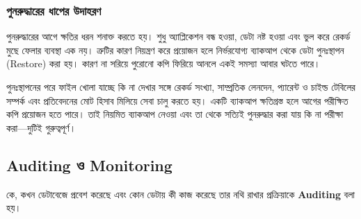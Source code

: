 \subsubsection{পুনরুদ্ধারের ধাপের উদাহরণ}
পুনরুদ্ধারের আগে ক্ষতির ধরন শনাক্ত করতে হয়। শুধু অ্যাপ্লিকেশন বন্ধ হওয়া, ডেটা নষ্ট হওয়া এবং ভুল করে রেকর্ড মুছে ফেলার ব্যবস্থা এক নয়। ত্রুটির কারণ নিয়ন্ত্রণ করে প্রয়োজন হলে নির্ভরযোগ্য ব্যাকআপ থেকে ডেটা পুনঃস্থাপন (Restore) করা হয়। কারণ না সরিয়ে পুরোনো কপি ফিরিয়ে আনলে একই সমস্যা আবার ঘটতে পারে।

পুনঃস্থাপনের পরে ফাইল খোলা যাচ্ছে কি না দেখার সঙ্গে রেকর্ড সংখ্যা, সাম্প্রতিক লেনদেন, প্যারেন্ট ও চাইল্ড টেবিলের সম্পর্ক এবং প্রতিবেদনের মোট হিসাব মিলিয়ে সেবা চালু করতে হয়। একটি ব্যাকআপ ক্ষতিগ্রস্ত হলে আগের পরীক্ষিত কপি প্রয়োজন হতে পারে। তাই নিয়মিত ব্যাকআপ নেওয়া এবং তা থেকে সত্যিই পুনরুদ্ধার করা যায় কি না পরীক্ষা করা—দুটিই গুরুত্বপূর্ণ।

\subsection{Auditing ও Monitoring}

\begin{definitionbox}{}

কে, কখন ডেটাবেজে প্রবেশ করেছে এবং কোন ডেটায় কী কাজ করেছে
তার নথি রাখার প্রক্রিয়াকে \textbf{Auditing} বলা হয়।

\end{definitionbox}

